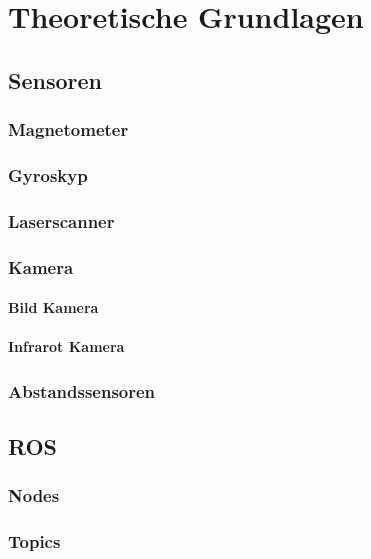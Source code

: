 \chapter{Theoretische Grundlagen}


\section{Sensoren}

    \subsection{Magnetometer}

    \subsection{Gyroskyp}

    \subsection{Laserscanner}

    \subsection{Kamera}

        \subsubsection{Bild Kamera}

        \subsubsection{Infrarot Kamera}

    \subsection{Abstandssensoren}

\section{ROS}

    \subsection{Nodes}

    \subsection{Topics}

